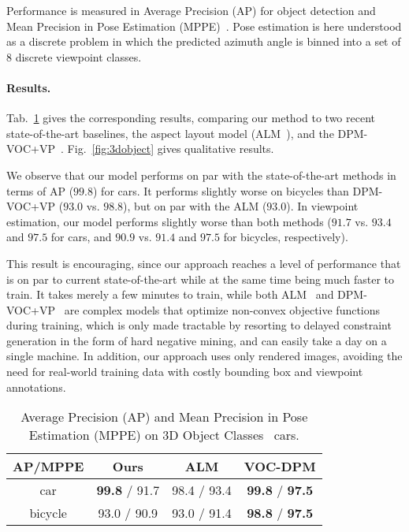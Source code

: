  Performance is measured in Average Precision
(AP) for object detection and Mean Precision in Pose Estimation
(MPPE)~\cite{Lopez-Sastre11}. Pose estimation is here understood as a
discrete problem in which the predicted azimuth angle is binned into a
set of $8$ discrete viewpoint classes.

\paragraph{Results.}
Tab.~\ref{tab:3dobject} gives the corresponding results, comparing our
method to two recent state-of-the-art baselines, the aspect layout
model (ALM~\cite{Xiang12}), and the
DPM-VOC+VP~\cite{Pepik12}. Fig.~\ref{fig:3dobject} gives
qualitative results.

We observe that our model performs on par with the state-of-the-art
methods in terms of AP ($99.8$) for cars. It performs slightly worse
on bicycles than DPM-VOC+VP ($93.0$ vs. $98.8$), but on par with the
ALM ($93.0$). In viewpoint estimation, our model performs slightly
worse than both methods ($91.7$ vs. $93.4$ and $97.5$ for cars, and
$90.9$ vs. $91.4$ and $97.5$ for bicycles, respectively).

This result is encouraging, since our approach reaches a level of
performance that is on par to current state-of-the-art while at the
same time being much faster to train. It takes merely a few minutes to
train, while both ALM~\cite{Xiang12} and DPM-VOC+VP~\cite{Pepik12} are
complex models that optimize non-convex objective functions during
training, which is only made tractable by resorting to delayed
constraint generation in the form of hard negative mining, and can
easily take a day on a single machine. In addition, our approach uses
only rendered images, avoiding the need for real-world training data
with costly bounding box and viewpoint annotations.
%
\begin{table}[!htbp]
    \footnotesize
  \begin{center}
    \begin{tabular}{|c|c|c|c|}
    \hline
     AP/MPPE& Ours & ALM\cite{Xiang12} & VOC-DPM\cite{Pepik12} \\
    \hline\hline
    car     & \textbf{99.8} / 91.7 & 98.4 / 93.4 & \textbf{99.8} / \textbf{97.5} \\ 
    bicycle & 93.0 / 90.9          & 93.0 / 91.4 & \textbf{98.8} / \textbf{97.5} \\
    \hline
    \end{tabular}
  \end{center}
  \caption{Average Precision (AP) and Mean Precision in Pose
    Estimation (MPPE) on 3D Object Classes~\cite{Savarese07} cars.}%
  \label{tab:3dobject}
\end{table}

